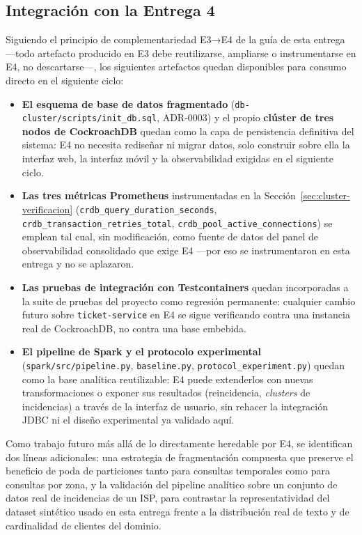 \documentclass[11pt,letterpaper]{article}
\begin{document}
\subsection{Integración con la Entrega 4}

Siguiendo el principio de complementariedad E3→E4 de la guía de esta entrega —todo artefacto
producido en E3 debe reutilizarse, ampliarse o instrumentarse en E4, no descartarse—, los
siguientes artefactos quedan disponibles para consumo directo en el siguiente ciclo:

\begin{itemize}[leftmargin=1.5em]
    \item \textbf{El esquema de base de datos fragmentado} (\texttt{db-cluster/scripts/init\_db.sql},
        ADR-0003) y el propio \textbf{clúster de tres nodos de CockroachDB} quedan como la capa de
        persistencia definitiva del sistema: E4 no necesita rediseñar ni migrar datos, solo construir
        sobre ella la interfaz web, la interfaz móvil y la observabilidad exigidas en el siguiente
        ciclo.
    \item \textbf{Las tres métricas Prometheus} instrumentadas en la
        Sección~\ref{sec:cluster-verificacion} (\texttt{crdb\_query\_duration\_seconds},
        \texttt{crdb\_transaction\_retries\_total}, \texttt{crdb\_pool\_active\_connections}) se
        emplean tal cual, sin modificación, como fuente de datos del panel de observabilidad
        consolidado que exige E4 —por eso se instrumentaron en esta entrega y no se aplazaron.
    \item \textbf{Las pruebas de integración con Testcontainers} quedan incorporadas a la suite de
        pruebas del proyecto como regresión permanente: cualquier cambio futuro sobre
        \texttt{ticket-service} en E4 se sigue verificando contra una instancia real de CockroachDB,
        no contra una base embebida.
    \item \textbf{El pipeline de Spark y el protocolo experimental} (\texttt{spark/src/pipeline.py},
        \texttt{baseline.py}, \texttt{protocol\_experiment.py}) quedan como la base analítica
        reutilizable: E4 puede extenderlos con nuevas transformaciones o exponer sus resultados
        (reincidencia, \emph{clusters} de incidencias) a través de la interfaz de usuario, sin
        rehacer la integración JDBC ni el diseño experimental ya validado aquí.
\end{itemize}

Como trabajo futuro más allá de lo directamente heredable por E4, se identifican dos líneas
adicionales: una estrategia de fragmentación compuesta que preserve el beneficio de poda de
particiones tanto para consultas temporales como para consultas por zona, y la validación del
pipeline analítico sobre un conjunto de datos real de incidencias de un ISP, para contrastar la
representatividad del dataset sintético usado en esta entrega frente a la distribución real de
texto y de cardinalidad de clientes del dominio.




\end{document}
